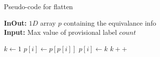 \begin{algorithm}[H]
\small
{
	\caption{Pseudo-code for flatten}
	\label{alg:flatten}
	\textbf{InOut:} $1D$ array $p$ containing the equivalance info \\
	\textbf{Input:} Max value of provisional label $count$
	\begin{algorithmic}[1]
		\State $k \gets 1$
				\State $p[i] \gets p[p[i]]$
			\Else
				\State $p[i] \gets k$
				\State $k++$
			\EndIf
		\EndFor
	\EndFunction
	\end{algorithmic}	
}
\end{algorithm}
